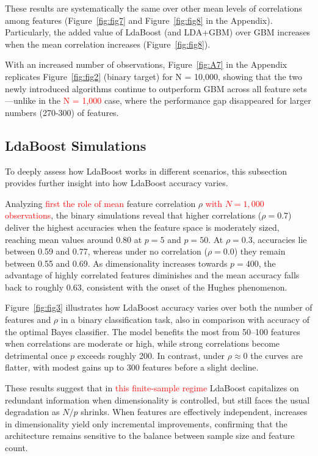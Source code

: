 \documentclass[11pt,a4paper]{article}
\providecommand{\DIFaddtex}[1]{\textcolor{red}{#1}}
\providecommand{\DIFaddbegin}{}
\providecommand{\DIFaddend}{}
\providecommand{\DIFadd}[1]{\texorpdfstring{\DIFaddtex{#1}}{#1}}
\begin{document}
\DIFaddend These results are systematically the same over other mean levels of correlations among features (Figure~\ref{fig:fig7} and Figure~\ref{fig:fig8} in the Appendix). Particularly, the added value of LdaBoost (and LDA+GBM) over GBM increases when the mean correlation increases (Figure~\ref{fig:fig8}). 

With an increased number of observations, Figure~\ref{fig:A7} in the Appendix replicates Figure~\ref{fig:fig2} (binary target) for N = 10,000, showing that the two newly introduced algorithms continue to outperform GBM across all feature sets—unlike in the  \DIFaddbegin \DIFadd{N = 1,000 }\DIFaddend case, where the performance gap disappeared for larger numbers (270-300) of features.

\subsection*{LdaBoost Simulations}
To deeply assess how LdaBoost works in different scenarios, this subsection provides further insight into how LdaBoost accuracy varies.

Analyzing  \DIFaddbegin \DIFadd{first the role of mean }\DIFaddend feature correlation $\rho$ \DIFaddbegin \DIFadd{with $N=1{,}000$ observations}\DIFaddend , the binary simulations reveal that higher correlations ($\rho = 0.7$) deliver the highest accuracies when the feature space is moderately sized, reaching mean values around 0.80 at $p = 5$ and $p = 50$. At $\rho = 0.3$, accuracies lie between 0.59 and 0.77, whereas under no correlation ($\rho = 0.0$) they remain between 0.55 and 0.69. As dimensionality increases towards $p = 400$, the advantage of highly correlated features diminishes and the mean accuracy falls back to roughly 0.63, consistent with the onset of the Hughes phenomenon.

Figure~\ref{fig:fig3} illustrates how LdaBoost accuracy varies over both the number of features and $\rho$ in a binary classification task, also in comparison with accuracy of the optimal Bayes classifier. The model benefits the most from 50--100 features when correlations are moderate or high, while strong correlations become detrimental once $p$ exceeds roughly 200. In contrast, under $\rho \approx 0$ the curves are flatter, with modest gains up to 300 features before a slight decline.

These results suggest that in  \DIFaddbegin \DIFadd{this finite-sample regime }\DIFaddend LdaBoost capitalizes on redundant information when dimensionality is controlled, but still faces the usual degradation as $N/p$ shrinks. When features are effectively independent, increases in dimensionality yield only incremental improvements, confirming that the architecture remains sensitive to the balance between sample size and feature count.
\end{document}
